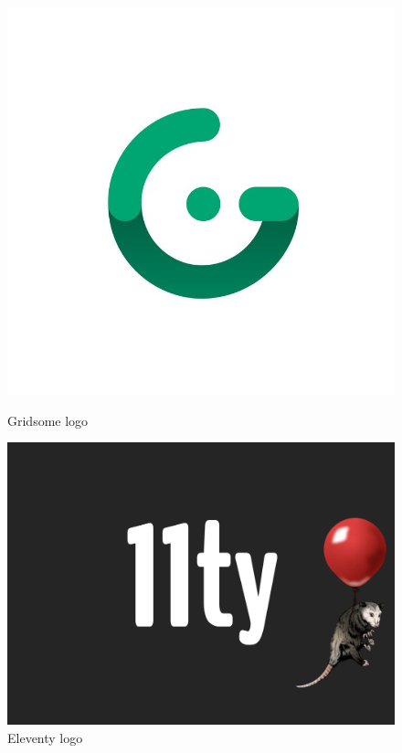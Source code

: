 \documentclass[target=bach,aauheader=]{thud}
\begin{document}

\begin{figure}[t]
    \begin{minipage}[t]{0.3\textwidth}
      \centering
      \includegraphics[width=\textwidth]{images/Gridsome-logo.png}
      \caption{Gridsome logo}
    \end{minipage}%
    \hfill
    \begin{minipage}[t]{0.3\textwidth}
      \centering
      \includegraphics[width=\textwidth]{images/Eleventy_logo.png}
      \caption{Eleventy logo}
    \end{minipage}
\end{figure}
\end{document}
